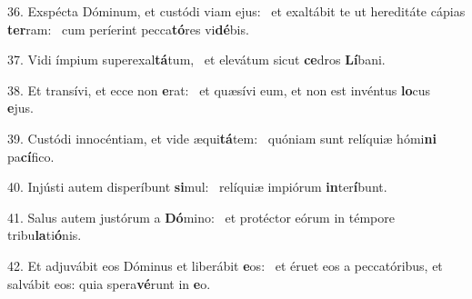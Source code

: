 36. Exspécta Dóminum, et custódi viam ejus: \dag\  et exaltábit te ut hereditáte cápias \textbf{ter}ram: \ast\  cum períerint pecca\textbf{tó}res vi\textbf{dé}bis.\

37. Vidi ímpium superexal\textbf{tá}tum, \ast\  et elevátum sicut \textbf{ce}dros \textbf{Lí}bani.\

38. Et transívi, et ecce non \textbf{e}rat: \ast\  et quæsívi eum, et non est invéntus \textbf{lo}cus \textbf{e}jus.\

39. Custódi innocéntiam, et vide æqui\textbf{tá}tem: \ast\  quóniam sunt relíquiæ hómi\textbf{ni} pa\textbf{cí}fico.\

40. Injústi autem disperíbunt \textbf{si}mul: \ast\  relíquiæ impiórum \textbf{in}ter\textbf{í}bunt.\

41. Salus autem justórum a \textbf{Dó}mino: \ast\  et protéctor eórum in témpore tribu\textbf{la}ti\textbf{ó}nis.\

42. Et adjuvábit eos Dóminus et liberábit \textbf{e}os: \ast\  et éruet eos a peccatóribus, et salvábit eos: quia spera\textbf{vé}runt in \textbf{e}o.\

